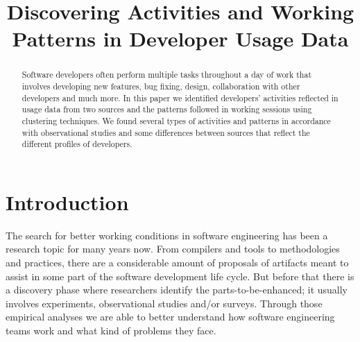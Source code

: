 \documentclass[conference]{IEEEtran}
\begin{document}
\title{Discovering Activities and Working Patterns in Developer Usage Data}



\author{
\and
{}
}







\maketitle


\begin{abstract}
Software developers often perform multiple tasks throughout a day of work that involves developing new features, bug fixing, design, collaboration with other developers and much more. In this paper we identified developers' activities reflected in usage data from two sources and the patterns followed in working sessions using clustering techniques. We found several types of activities and patterns in accordance with observational studies and some differences between sources that reflect the different profiles of developers.
\end{abstract}





%
\IEEEpeerreviewmaketitle



\section{Introduction}
The search for better working conditions in software engineering has been a research topic for many years now. From compilers and tools to methodologies and practices, there are a considerable amount of proposals of artifacts meant to assist in some part of the software development life cycle. But before that there is a discovery phase where researchers identify the parts-to-be-enhanced; it usually involves experiments, observational studies and/or surveys. Through those empirical analyses we are able to better understand how software engineering teams work and what kind of problems they face.
\end{document}
